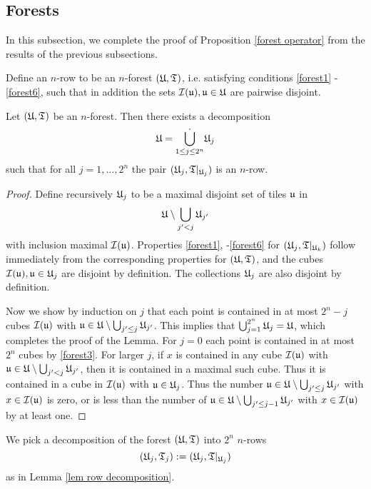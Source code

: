 {\subsection{Forests}
In this subsection, we complete the proof of Proposition \ref{forest operator} from the results of the previous subsections.

Define an $n$-row to be an $n$-forest $(\mathfrak U, \mathfrak T)$, i.e. satisfying conditions \eqref{forest1} - \eqref{forest6}, such that in addition the sets $\mathcal{I}(\mathfrak u), \mathfrak u \in \mathfrak U$ are pairwise disjoint.

\begin{lemma}
    \label{lem row decomposition}
    Let $(\mathfrak U, \mathfrak T)$ be an $n$-forest. Then there exists a decomposition
    $$
        \mathfrak U = \dot{\bigcup_{1 \le j \le 2^n}} \mathfrak U_j
    $$
    such that for all $j = 1, \dotsc, 2^n$ the pair $(\mathfrak U_j, \mathfrak T|_{\mathfrak U_j})$ is an $n$-row.
\end{lemma}

\begin{proof}
    Define recursively $\mathfrak U_j$ to be a maximal disjoint set of tiles $\mathfrak u$ in
    $$
        \mathfrak U \setminus \bigcup_{j' < j} \mathfrak U_{j'}
    $$
    with inclusion maximal $\mathcal{I}(\mathfrak u)$. Properties \eqref{forest1}, -\eqref{forest6} for $(\mathfrak U_j, \mathfrak T|_{\mathfrak U_k})$ follow immediately from the corresponding properties for $(\mathfrak U, \mathfrak T)$, and the cubes $\mathcal{I}(\mathfrak u), \mathfrak u \in \mathfrak U_j$ are disjoint by definition. The collections $\mathfrak U_j$ are also disjoint by definition.

    Now we show by induction on $j$ that each point is contained in at most  $2^n - j$ cubes $\mathcal{I}(\mathfrak u)$ with $\mathfrak u \in \mathfrak U \setminus \bigcup_{j' \le j} \mathfrak U_{j'}$. This implies that $\bigcup_{j = 1}^{2^n} \mathfrak U_j = \mathfrak U$, which completes the proof of the Lemma. For $j = 0$ each point is contained in at most $2^n$ cubes by \eqref{forest3}. For larger $j$, if $x$ is contained in any cube $\mathcal{I}(\mathfrak u)$ with $\mathfrak u \in \mathfrak U \setminus \bigcup_{j' < j} \mathfrak U_{j'}$, then it is contained in a maximal such cube. Thus it is contained in a cube in $\mathcal{I}(\mathfrak u)$ with $\mathfrak u \in \mathfrak U_j$. Thus the number $\mathfrak u \in \mathfrak U \setminus \bigcup_{j' \le j} \mathfrak U_{j'}$ with $x\in \mathcal{I}(\mathfrak u)$ is zero, or is less than the number of $\mathfrak u \in \mathfrak U \setminus \bigcup_{j' \le j-1} \mathfrak U_{j'}$ with $x \in \mathcal{I}(\mathfrak u)$ by at least one.
\end{proof}

We pick a decomposition of the forest $(\mathfrak U, \mathfrak T)$ into $2^n$ $n$-rows
\begin{equation*}
(\mathfrak U_j, \mathfrak T_j) := (\mathfrak U_j, \mathfrak T|_{\mathfrak U_j})
\end{equation*}
as in Lemma \ref{lem row decomposition}.

}
